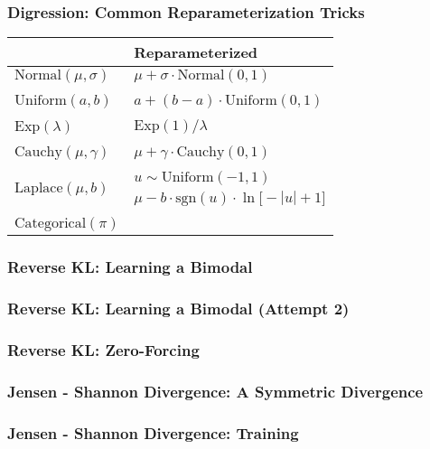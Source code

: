 \documentclass{beamer}
\newcommand{\xmark}{\textcolor{red}{\ding{55}}}
\begin{document}
\begin{frame}
  \frametitle{Digression: Common Reparameterization Tricks}
  \begin{center}
  \begin{tabular}{C{4cm}C{4cm}}
  \toprule
  {} & Reparameterized \\
  \midrule
  $\text{Normal}(\mu, \sigma)$   &  $\mu + \sigma \cdot \text{Normal}(0, 1)$ \\
  \\
  $\text{Uniform}(a, b)$   &  $a + (b - a) \cdot \text{Uniform}(0, 1)$ \\
  \\
  $\text{Exp}(\lambda)$   &  $\text{Exp}(1) / \lambda$ \\
  \\
  $\text{Cauchy}(\mu, \gamma)$   &  $\mu + \gamma \cdot \text{Cauchy}(0, 1)$ \\
  \\
    &  $u \sim \text{Uniform}(-1, 1)$ \\
                                          & $\mu - b \cdot \text{sgn}(u) \cdot \ln \big[-|u|+1 \big]$ \\
                                          \\
  $\text{Categorical}(\pi)$ & \xmark \\
  \bottomrule
  \end{tabular}
  \end{center}
\end{frame}

\begin{frame}
  \frametitle{Reverse KL: Learning a Bimodal}

\end{frame}


\begin{frame}
  \frametitle{Reverse KL: Learning a Bimodal (Attempt 2)}

\end{frame}


\begin{frame}
  \frametitle{Reverse KL: Zero-Forcing}

\end{frame}


\begin{frame}
  \frametitle{Jensen - Shannon Divergence: A Symmetric Divergence}

\end{frame}


\begin{frame}
  \frametitle{Jensen - Shannon Divergence: Training}

\end{frame}
\end{document}

